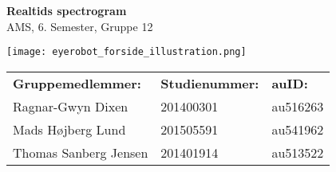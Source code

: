 \begingroup
\thispagestyle{empty}
\centering
\Huge{\textbf{Realtids spectrogram}}\\
{\Large AMS, 6. Semester, Gruppe 12}

\begin{center}
	\texttt{[image: eyerobot\_forside\_illustration.png]}
\end{center}
{\small
	\begin{center}
		\begin{tabu} to 0.8\textwidth { X[l,2]  X[c,1] X[c,1] }
			\textbf{Gruppemedlemmer:}		& \textbf{Studienummer:}	& \textbf{auID:}\\
			Ragnar-Gwyn Dixen 		& 201400301		& au516263\\
			Mads Højberg Lund		& 201505591		& au541962\\
			Thomas Sanberg Jensen	& 201401914 	& au513522\\
		\end{tabu}
\end{center}}
\endgroup
\newpage
%